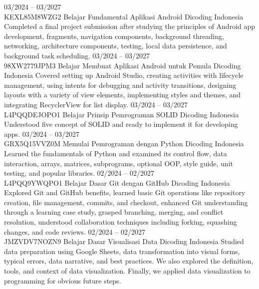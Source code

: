 \documentclass[9pt]{developercv} %
\begin{document}
\vspace{-1 pt}
\begin{entrylist}
	\entry
	{03/2024 -- 03/2027
		\\\footnotesize{KEXL85M8WZG2}}
	{Belajar Fundamental Aplikasi Android}
	{Dicoding Indonesia}
	{Completed a final project submission after studying the principles of Android app development, fragments, navigation components, background threading, networking, architecture components, testing, local data persistence, and background task scheduling.}
	\entry
	{03/2024 -- 03/2027
		\\\footnotesize{98XW2779JPM3}}
	{Belajar Membuat Aplikasi Android untuk Pemula}
	{Dicoding Indonesia}
	{Covered setting up Android Studio, creating activities with lifecycle management, using intents for debugging and activity transitions, designing layouts with a variety of view elements, implementing styles and themes, and integrating RecyclerView for list display.}
	\entry
	{03/2024 -- 03/2027
		\\\footnotesize{L4PQQDEJOPO1}}
	{Belajar Prinsip Pemrograman SOLID}
	{Dicoding Indonesia}
	{Understood five concept of SOLID and ready to implement it for developing apps.}
	\entry
	{03/2024 -- 03/2027
		\\\footnotesize{GRX5Q15VVZ0M}}
	{Memulai Pemrograman dengan Python}
	{Dicoding Indonesia}
	{Learned the fundamentals of Python and examined its control flow, data interaction, arrays, matrices, subprograms, optional OOP, style guide, unit testing, and popular libraries.}
	\entry
	{02/2024 -- 02/2027
		\\\footnotesize{L4PQQ9YWQPO1}}
	{Belajar Dasar Git dengan GitHub}
	{Dicoding Indonesia}
	{Explored Git and GitHub benefits, learned basic Git operations like repository creation, file management, commits, and checkout, enhanced Git understanding through a learning case study, grasped branching, merging, and conflict resolution, understood collaboration techniques including forking, squashing changes, and code reviews.}
	\entry
	{02/2024 -- 02/2027
		\\\footnotesize{JMZVDV7NOZN9}}
	{Belajar Dasar Visualisasi Data}
	{Dicoding Indonesia}
	{Studied data preparation using Google Sheets, data transformation into visual forms, typical errors, data narrative, and best practices. We also explored the definition, tools, and context of data visualization. Finally, we applied data visualization to programming for obvious future steps.}

\end{entrylist}
\end{document}
